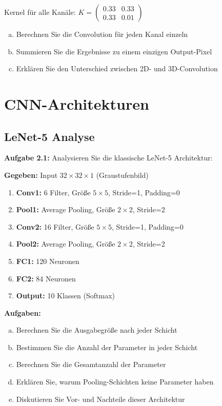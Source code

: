 \documentclass[12pt,a4paper]{article}
\begin{document}
Kernel für alle Kanäle: $K = \begin{pmatrix} 0.33 & 0.33 \\ 0.33 & 0.01 \end{pmatrix}$

\begin{enumerate}[(a)]
    \item Berechnen Sie die Convolution für jeden Kanal einzeln
    \item Summieren Sie die Ergebnisse zu einem einzigen Output-Pixel
    \item Erklären Sie den Unterschied zwischen 2D- und 3D-Convolution
\end{enumerate}

\section{CNN-Architekturen}

\subsection{LeNet-5 Analyse}

\textbf{Aufgabe 2.1:} Analysieren Sie die klassische LeNet-5 Architektur:

\textbf{Gegeben:} Input $32 \times 32 \times 1$ (Graustufenbild)
\begin{enumerate}
    \item \textbf{Conv1:} 6 Filter, Größe $5 \times 5$, Stride=1, Padding=0
    \item \textbf{Pool1:} Average Pooling, Größe $2 \times 2$, Stride=2
    \item \textbf{Conv2:} 16 Filter, Größe $5 \times 5$, Stride=1, Padding=0  
    \item \textbf{Pool2:} Average Pooling, Größe $2 \times 2$, Stride=2
    \item \textbf{FC1:} 120 Neuronen
    \item \textbf{FC2:} 84 Neuronen
    \item \textbf{Output:} 10 Klassen (Softmax)
\end{enumerate}

\textbf{Aufgaben:}
\begin{enumerate}[(a)]
    \item Berechnen Sie die Ausgabegröße nach jeder Schicht
    \item Bestimmen Sie die Anzahl der Parameter in jeder Schicht
    \item Berechnen Sie die Gesamtanzahl der Parameter
    \item Erklären Sie, warum Pooling-Schichten keine Parameter haben
    \item Diskutieren Sie Vor- und Nachteile dieser Architektur
\end{enumerate}
\end{document}

